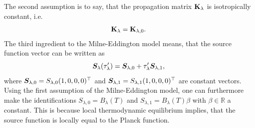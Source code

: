 \documentclass[a4paper,12pt]{report}
\begin{document}
The second assumption is to say, that the propagation matrix $\boldsymbol{\mathbf{K}}_\lambda$ is isotropically constant, i.e. \begin{equation}
\boldsymbol{\mathbf{K}}_\lambda = \boldsymbol{\mathbf{K}}_{\lambda,0}.
\end{equation} The third ingredient to the Milne-Eddington model means, that the source function vector can be written as \begin{equation}
\bm{S}_\lambda(\tau_\lambda^\prime) = \bm{S}_{\lambda,0} + \tau_\lambda^\prime \bm{S}_{\lambda,1},
\end{equation} where $\bm{S}_{\lambda,0} = S_{\lambda,0}(1,0,0,0)^\top$ and $\bm{S}_{\lambda,1}=S_{\lambda,1}(1,0,0,0)^\top$ are constant vectors. Using the first assumption of the Milne-Eddington model, one can furthermore make the identifications $S_{\lambda,0} = B_\lambda(T)$ and $S_{\lambda,1} = B_\lambda(T)\beta$ with $\beta \in \mathbb{R}$ a constant. This is because local thermodynamic equilibrium implies, that the source function is locally equal to the Planck function.
\end{document}
